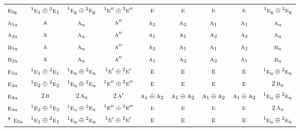 \documentclass[10pt,a4paper]{article}
\numberwithin{equation}{section}
\newcommand{\irr}[1]{\text{\normalfont\scshape #1}}
\newcommand{\conjpair}[1]{{}^{#1}}
\newcommand{\ptag}[1]{\mathrm{#1}}
\begin{document}
{\begin{longtable}{@{}lcccccccc@{}}
$\irr{e}_{5\ptag{g}}$ & $\conjpair{1}\irr{e}_{1}\oplus \conjpair{2}\irr{e}_{1}$ & $\conjpair{1}\irr{e}_{\ptag{g}}\oplus \conjpair{2}\irr{e}_{\ptag{g}}$ & $\conjpair{1}\irr{e}''\oplus \conjpair{2}\irr{e}''$ & $\irr{e}$ & $\irr{e}$ & $\irr{e}$ & $\irr{e}$ & $\conjpair{1}\irr{e}_{\ptag{g}}\oplus \conjpair{2}\irr{e}_{\ptag{g}}$\\
$\irr{a}_{1\ptag{u}}$ & $\irr{a}$ & $\irr{a}_{\ptag{u}}$ & $\irr{a}''$ & $\irr{a}_{2}$ & $\irr{a}_{2}$ & $\irr{a}_{1}$ & $\irr{a}_{1}$ & $\irr{a}_{\ptag{u}}$\\
$\irr{a}_{2\ptag{u}}$ & $\irr{a}$ & $\irr{a}_{\ptag{u}}$ & $\irr{a}''$ & $\irr{a}_{1}$ & $\irr{a}_{1}$ & $\irr{a}_{2}$ & $\irr{a}_{2}$ & $\irr{a}_{\ptag{u}}$\\
$\irr{b}_{1\ptag{u}}$ & $\irr{a}$ & $\irr{a}_{\ptag{u}}$ & $\irr{a}''$ & $\irr{a}_{2}$ & $\irr{a}_{1}$ & $\irr{a}_{1}$ & $\irr{a}_{2}$ & $\irr{b}_{\ptag{u}}$\\
$\irr{b}_{2\ptag{u}}$ & $\irr{a}$ & $\irr{a}_{\ptag{u}}$ & $\irr{a}''$ & $\irr{a}_{1}$ & $\irr{a}_{2}$ & $\irr{a}_{2}$ & $\irr{a}_{1}$ & $\irr{b}_{\ptag{u}}$\\
$\irr{e}_{1\ptag{u}}$ & $\conjpair{1}\irr{e}_{1}\oplus \conjpair{2}\irr{e}_{1}$ & $\conjpair{1}\irr{e}_{\ptag{u}}\oplus \conjpair{2}\irr{e}_{\ptag{u}}$ & $\conjpair{1}\irr{e}'\oplus \conjpair{2}\irr{e}'$ & $\irr{e}$ & $\irr{e}$ & $\irr{e}$ & $\irr{e}$ & $\conjpair{1}\irr{e}_{\ptag{u}}\oplus \conjpair{2}\irr{e}_{\ptag{u}}$\\
$\irr{e}_{2\ptag{u}}$ & $\conjpair{1}\irr{e}_{2}\oplus \conjpair{2}\irr{e}_{2}$ & $\conjpair{1}\irr{e}_{\ptag{u}}\oplus \conjpair{2}\irr{e}_{\ptag{u}}$ & $\conjpair{1}\irr{e}''\oplus \conjpair{2}\irr{e}''$ & $\irr{e}$ & $\irr{e}$ & $\irr{e}$ & $\irr{e}$ & $2\,\irr{b}_{\ptag{u}}$\\
$\irr{e}_{3\ptag{u}}$ & $2\,\irr{b}$ & $2\,\irr{a}_{\ptag{u}}$ & $2\,\irr{a}'$ & $\irr{a}_{1}\oplus \irr{a}_{2}$ & $\irr{a}_{1}\oplus \irr{a}_{2}$ & $\irr{a}_{1}\oplus \irr{a}_{2}$ & $\irr{a}_{1}\oplus \irr{a}_{2}$ & $\conjpair{1}\irr{e}_{\ptag{u}}\oplus \conjpair{2}\irr{e}_{\ptag{u}}$\\
$\irr{e}_{4\ptag{u}}$ & $\conjpair{1}\irr{e}_{2}\oplus \conjpair{2}\irr{e}_{2}$ & $\conjpair{1}\irr{e}_{\ptag{u}}\oplus \conjpair{2}\irr{e}_{\ptag{u}}$ & $\conjpair{1}\irr{e}''\oplus \conjpair{2}\irr{e}''$ & $\irr{e}$ & $\irr{e}$ & $\irr{e}$ & $\irr{e}$ & $2\,\irr{a}_{\ptag{u}}$\\*
$\irr{e}_{5\ptag{u}}$ & $\conjpair{1}\irr{e}_{1}\oplus \conjpair{2}\irr{e}_{1}$ & $\conjpair{1}\irr{e}_{\ptag{u}}\oplus \conjpair{2}\irr{e}_{\ptag{u}}$ & $\conjpair{1}\irr{e}'\oplus \conjpair{2}\irr{e}'$ & $\irr{e}$ & $\irr{e}$ & $\irr{e}$ & $\irr{e}$ & $\conjpair{1}\irr{e}_{\ptag{u}}\oplus \conjpair{2}\irr{e}_{\ptag{u}}$\\
\bottomrule\end{longtable}}
\end{document}
